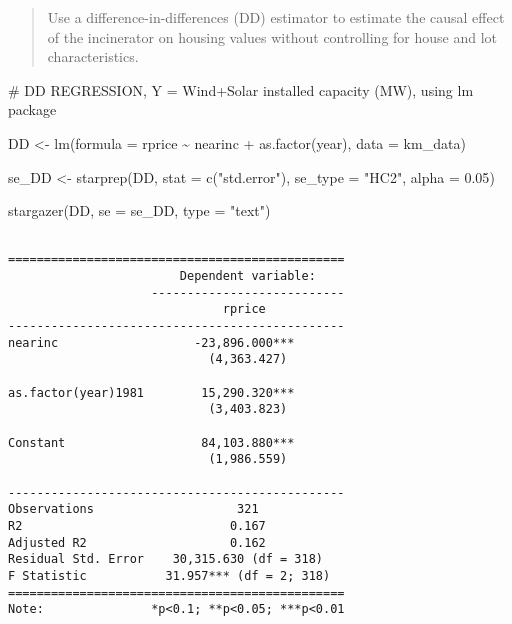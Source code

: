 \documentclass[
  letterpaper,
  DIV=11,
  numbers=noendperiod]{scrartcl}
\newenvironment{Shaded}{\begin{snugshade}}{\end{snugshade}}
\newcommand{\AttributeTok}[1]{\textcolor[rgb]{0.40,0.45,0.13}{#1}}
\newcommand{\CommentTok}[1]{\textcolor[rgb]{0.37,0.37,0.37}{#1}}
\newcommand{\FloatTok}[1]{\textcolor[rgb]{0.68,0.00,0.00}{#1}}
\newcommand{\FunctionTok}[1]{\textcolor[rgb]{0.28,0.35,0.67}{#1}}
\newcommand{\NormalTok}[1]{\textcolor[rgb]{0.00,0.23,0.31}{#1}}
\newcommand{\OtherTok}[1]{\textcolor[rgb]{0.00,0.23,0.31}{#1}}
\newcommand{\SpecialCharTok}[1]{\textcolor[rgb]{0.37,0.37,0.37}{#1}}
\newcommand{\StringTok}[1]{\textcolor[rgb]{0.13,0.47,0.30}{#1}}
\begin{document}
\begin{quote}
Use a difference-in-differences (DD) estimator to estimate the causal
effect of the incinerator on housing values without controlling for
house and lot characteristics.
\end{quote}

\begin{Shaded}
\begin{Highlighting}[]
\CommentTok{\# DD REGRESSION, Y = Wind+Solar installed capacity (MW), using lm package}

\NormalTok{DD }\OtherTok{\textless{}{-}} \FunctionTok{lm}\NormalTok{(}\AttributeTok{formula =}\NormalTok{ rprice }\SpecialCharTok{\textasciitilde{}}\NormalTok{ nearinc}
         \SpecialCharTok{+} \FunctionTok{as.factor}\NormalTok{(year),}
         \AttributeTok{data =}\NormalTok{ km\_data)}

\NormalTok{se\_DD }\OtherTok{\textless{}{-}} \FunctionTok{starprep}\NormalTok{(DD,}
                  \AttributeTok{stat =} \FunctionTok{c}\NormalTok{(}\StringTok{"std.error"}\NormalTok{),}
                  \AttributeTok{se\_type =} \StringTok{"HC2"}\NormalTok{,}
                  \AttributeTok{alpha =} \FloatTok{0.05}\NormalTok{)}

\FunctionTok{stargazer}\NormalTok{(DD,}
          \AttributeTok{se =}\NormalTok{ se\_DD,}
          \AttributeTok{type =} \StringTok{"text"}\NormalTok{)}
\end{Highlighting}
\end{Shaded}

\begin{verbatim}

===============================================
                        Dependent variable:    
                    ---------------------------
                              rprice           
-----------------------------------------------
nearinc                   -23,896.000***       
                            (4,363.427)        
                                               
as.factor(year)1981        15,290.320***       
                            (3,403.823)        
                                               
Constant                   84,103.880***       
                            (1,986.559)        
                                               
-----------------------------------------------
Observations                    321            
R2                             0.167           
Adjusted R2                    0.162           
Residual Std. Error    30,315.630 (df = 318)   
F Statistic           31.957*** (df = 2; 318)  
===============================================
Note:               *p<0.1; **p<0.05; ***p<0.01
\end{verbatim}
\end{document}
